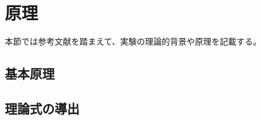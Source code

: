 

\section{原理}
本節では参考文献\cite{sample1}を踏まえて、実験の理論的背景や原理を記載する。

\subsection{基本原理}

\subsection{理論式の導出}
